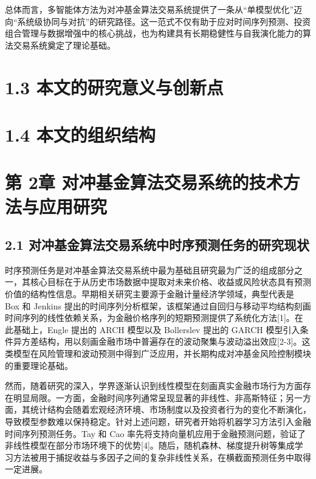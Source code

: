 \documentclass[UTF8]{ctexart}
\begin{document}
总体而言，多智能体方法为对冲基金算法交易系统提供了一条从``单模型优化''迈向``系统级协同与对抗''的研究路径。这一范式不仅有助于应对时间序列预测、投资组合管理与数据增强中的核心挑战，也为构建具有长期稳健性与自我演化能力的算法交易系统奠定了理论基础。

\section{\texorpdfstring{1.3 本文的研究意义与创新点
}{1.3 本文的研究意义与创新点 }}\label{ux672cux6587ux7684ux7814ux7a76ux610fux4e49ux4e0eux521bux65b0ux70b9}

\section{1.4
本文的组织结构}\label{ux672cux6587ux7684ux7ec4ux7ec7ux7ed3ux6784}

\section{\texorpdfstring{第 2章 对冲基金算法交易系统的技术方法与应用研究
}{第 2章 对冲基金算法交易系统的技术方法与应用研究 }}\label{ux7b2c-2ux7ae0-ux5bf9ux51b2ux57faux91d1ux7b97ux6cd5ux4ea4ux6613ux7cfbux7edfux7684ux6280ux672fux65b9ux6cd5ux4e0eux5e94ux7528ux7814ux7a76}

\subsection{2.1
对冲基金算法交易系统中时序预测任务的研究现状}\label{ux5bf9ux51b2ux57faux91d1ux7b97ux6cd5ux4ea4ux6613ux7cfbux7edfux4e2dux65f6ux5e8fux9884ux6d4bux4efbux52a1ux7684ux7814ux7a76ux73b0ux72b6}

时序预测任务是对冲基金算法交易系统中最为基础且研究最为广泛的组成部分之一，其核心目标在于从历史市场数据中提取对未来价格、收益或风险状态具有预测价值的结构性信息。早期相关研究主要源于金融计量经济学领域，典型代表是
Box 和 Jenkins
提出的时间序列分析框架，该框架通过自回归与移动平均结构刻画时间序列的线性依赖关系，为金融价格序列的短期预测提供了系统化方法{[}1{]}。在此基础上，Engle
提出的 ARCH 模型以及 Bollerslev 提出的 GARCH
模型引入条件异方差结构，用以刻画金融市场中普遍存在的波动聚集与波动溢出效应{[}2-3{]}。这类模型在风险管理和波动预测中得到广泛应用，并长期构成对冲基金风险控制模块的重要理论基础。

然而，随着研究的深入，学界逐渐认识到线性模型在刻画真实金融市场行为方面存在明显局限。一方面，金融时间序列通常呈现显著的非线性、非高斯特征；另一方面，其统计结构会随着宏观经济环境、市场制度以及投资者行为的变化不断演化，导致模型参数难以保持稳定。针对上述问题，研究者开始将机器学习方法引入金融时间序列预测任务。Tay
和 Cao
率先将支持向量机应用于金融预测问题，验证了非线性模型在部分市场环境下的优势{[}4{]}。随后，随机森林、梯度提升树等集成学习方法被用于捕捉收益与多因子之间的复杂非线性关系，在横截面预测任务中取得一定进展。
\end{document}
